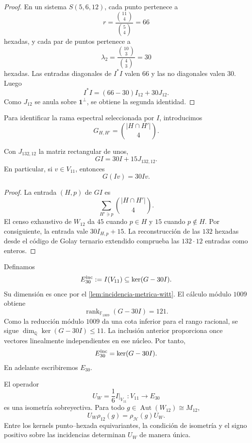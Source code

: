 \begin{proof}
En un sistema \(S(5,6,12)\), cada punto pertenece a
\[
 r=\frac{\binom{11}{4}}{\binom54}=66
\]
hexadas, y cada par de puntos pertenece a
\[
 \lambda_2=\frac{\binom{10}{3}}{\binom43}=30
\]
hexadas. Las entradas diagonales de \(I^*I\) valen \(66\) y las no
diagonales valen \(30\). Luego
\[
 I^*I=(66-30)I_{12}+30J_{12}.
\]
Como \(J_{12}\) se anula sobre \(\mathbf1^\perp\), se obtiene la segunda
identidad.
\end{proof}

Para identificar la rama espectral seleccionada por \(I\), introducimos
\[
 G_{H,H'}=\binom{|H\cap H'|}{4}.
\]

\begin{lemma}
\label{lem:incidencia-espectral-witt}
Con \(J_{132,12}\) la matriz rectangular de unos,
\[
 \boxed{GI=30I+15J_{132,12}.}
\]
En particular, si \(v\in V_{11}\), entonces
\[
 G(Iv)=30Iv.
\]
\end{lemma}

\begin{proof}
La entrada \((H,p)\) de \(GI\) es
\[
 \sum_{H'\ni p}\binom{|H\cap H'|}{4}.
\]
El censo exhaustivo de \(W_{12}\) da \(45\) cuando \(p\in H\) y \(15\)
cuando \(p\notin H\). Por consiguiente, la entrada vale
\(30I_{H,p}+15\). La reconstrucción de las \(132\) hexadas desde el código
de Golay ternario extendido comprueba las \(132\cdot12\) entradas como
enteros.
\end{proof}

Definamos
\[
 E_{30}^{\rm inc}:=I(V_{11})\subseteq\ker(G-30I).
\]
Su dimensión es once por el \cref{lem:incidencia-metrica-witt}. El cálculo
módulo \(1009\) obtiene
\[
 \operatorname{rank}_{\mathbb F_{1009}}(G-30I)=121.
\]
Como la reducción módulo \(1009\) da una cota inferior para el rango
racional, se sigue
\(\dim_{\mathbb Q}\ker(G-30I)\le11\). La inclusión anterior proporciona
once vectores linealmente independientes en ese núcleo. Por tanto,
\[
 E_{30}^{\rm inc}=\ker(G-30I).
\]
En adelante escribiremos \(E_{30}\).

\begin{theorem}
\label{thm:entrelazador-dodecafase-witt}
El operador
\[
 \boxed{
 U_W=\frac16 I\big|_{V_{11}}:V_{11}\longrightarrow E_{30}
 }
\]
es una isometría sobreyectiva. Para todo
\(g\in\operatorname{Aut}(W_{12})\cong M_{12}\),
\[
 U_W\rho_{12}(g)=\rho_{\mathcal H}(g)U_W.
\]
Entre los kernels punto--hexada equivariantes, la condición de isometría y
el signo positivo sobre las incidencias determinan \(U_W\) de manera única.
\end{theorem}

